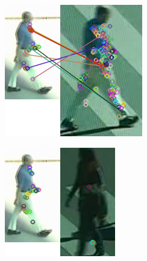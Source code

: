 \begin{figure}[!h]
\begin{subfigure}[!h]{0.24\textwidth}
	\end{subfigure}
	\begin{subfigure}[!h]{0.24\textwidth}
		\includegraphics[width=\linewidth]{images/recognition/kpSample_samePerson}
	\end{subfigure}
	\begin{subfigure}[!h]{0.24\textwidth}
		\includegraphics[width=\linewidth]{images/recognition/kpSample_noMatch}

\end{subfigure}
\end{figure}

